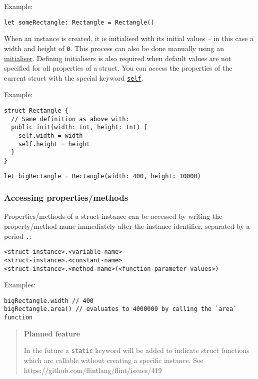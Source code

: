 Example:

\begin{verbatim}
let someRectangle: Rectangle = Rectangle()
\end{verbatim}

When an instance is created, it is initialised with its initial values – in this case a width and height of \texttt{0}. This process can also be done manually using an \hyperref[sec:appendix-b-initialisers]{initialiser}. Defining initialisers is also required when default values are not specified for all properties of a struct. You can access the properties of the current struct with the special keyword \hyperref[sec:appendix-b-self]{\texttt{self}}.

Example:

\begin{verbatim}
struct Rectangle {
  // Same definition as above with:
  public init(width: Int, height: Int) {
    self.width = width
    self.height = height
  }
}
\end{verbatim}

\begin{verbatim}
let bigRectangle = Rectangle(width: 400, height: 10000)
\end{verbatim}

\subsubsection{Accessing properties/methods}
\label{sec:appendix-b-accessing-propertiesmethods}

Properties/methods of a struct instance can be accessed by writing the property/method name immediately after the instance identifier, separated by a period \texttt{.}:

\begin{verbatim}
<struct-instance>.<variable-name>
<struct-instance>.<constant-name>
<struct-instance>.<method-name>(<function-parameter-values>)
\end{verbatim}

Examples:

\begin{verbatim}
bigRectangle.width // 400
bigRectangle.area() // evaluates to 4000000 by calling the `area` function
\end{verbatim}

\begin{quote}
\textbf{Planned feature}

In the future a \texttt{static} keyword will be added to indicate struct functions which are callable without creating a specific instance. See https://github.com/flintlang/flint/issues/419
\end{quote}

